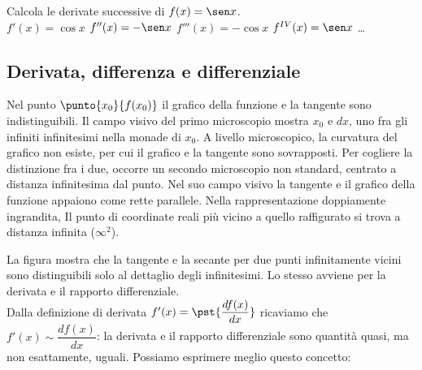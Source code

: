\begin{esempio}
 Calcola le derivate successive di $f(x)=\sen x$.\\
 $f'(x)=\cos x$ \hspace{1cm}$ f''(x)=-\sen x$ \hspace{1cm}
 $f'''(x)=-\cos x$ \hspace{1cm} $f^{IV}(x)=\sen x$ \dots
\end{esempio}


\subsection{Derivata, differenza e differenziale}
\label{subsec:diff01_deridiff}

\begin{inaccessibleblock}
  \begin{minipage}[]{.47\textwidth}
    \begin{center} \derivata \end{center}
 \end{minipage} 
  \hfill
 \begin{minipage}[]{.47\textwidth} \vspace{2.5em}
Nel punto $\punto{x_0}{f(x_0)}$ il grafico della funzione e la tangente
sono indistinguibili. 
Il campo visivo del primo microscopio mostra ${x_0}$ e $dx$, 
uno fra gli infiniti infinitesimi nella monade di $x_0$. A livello 
microscopico, la curvatura del grafico non esiste,  per cui il grafico e la 
tangente sono sovrapposti. Per cogliere la distinzione fra i due, occorre 
un secondo microscopio non standard, centrato a distanza infinitesima dal 
punto. Nel suo campo visivo la tangente e il grafico della funzione 
appaiono come rette parallele. Nella rappresentazione doppiamente ingrandita,
Il punto di coordinate reali più vicino a quello raffigurato  si trova a 
distanza infinita ($\infty^2$).
 \end{minipage}
\end{inaccessibleblock}
\label{}
La figura mostra che la tangente e la secante per due punti infinitamente 
vicini sono distinguibili solo al dettaglio degli infinitesimi. Lo 
stesso avviene per la derivata e il rapporto differenziale.\\
Dalla definizione di derivata $f'(x)=\pst{\dfrac{df(x)}{dx}}$ ricaviamo che
$f'(x)\sim \dfrac{df(x)}{dx}$: la derivata e il rapporto differenziale 
sono quantità quasi, ma non esattamente, uguali. Possiamo esprimere 
meglio questo concetto:\\
